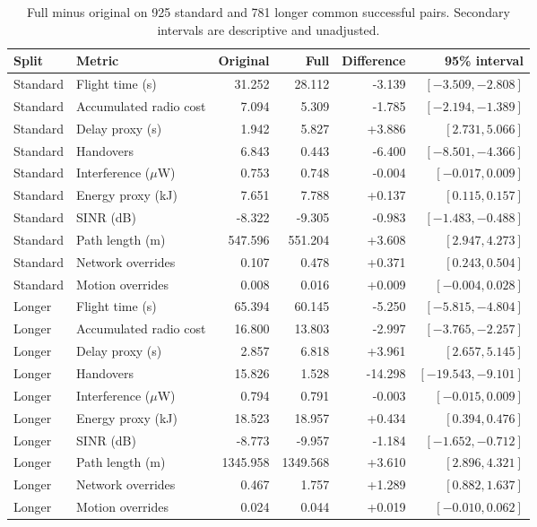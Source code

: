 \begin{table}[!t]
\caption{Full minus original on 925 standard and 781 longer common successful pairs. Secondary intervals are descriptive and unadjusted.}
\label{tab:paired}\centering\small
\begin{tabular}{llrrrr}\toprule
Split & Metric & Original & Full & Difference & 95\% interval\\\midrule
Standard & Flight time (s) & 31.252 & 28.112 & -3.139 & $[-3.509, -2.808]$\\
Standard & Accumulated radio cost & 7.094 & 5.309 & -1.785 & $[-2.194, -1.389]$\\
Standard & Delay proxy (s) & 1.942 & 5.827 & +3.886 & $[2.731, 5.066]$\\
Standard & Handovers & 6.843 & 0.443 & -6.400 & $[-8.501, -4.366]$\\
Standard & Interference ($\mu$W) & 0.753 & 0.748 & -0.004 & $[-0.017, 0.009]$\\
Standard & Energy proxy (kJ) & 7.651 & 7.788 & +0.137 & $[0.115, 0.157]$\\
Standard & SINR (dB) & -8.322 & -9.305 & -0.983 & $[-1.483, -0.488]$\\
Standard & Path length (m) & 547.596 & 551.204 & +3.608 & $[2.947, 4.273]$\\
Standard & Network overrides & 0.107 & 0.478 & +0.371 & $[0.243, 0.504]$\\
Standard & Motion overrides & 0.008 & 0.016 & +0.009 & $[-0.004, 0.028]$\\
Longer & Flight time (s) & 65.394 & 60.145 & -5.250 & $[-5.815, -4.804]$\\
Longer & Accumulated radio cost & 16.800 & 13.803 & -2.997 & $[-3.765, -2.257]$\\
Longer & Delay proxy (s) & 2.857 & 6.818 & +3.961 & $[2.657, 5.145]$\\
Longer & Handovers & 15.826 & 1.528 & -14.298 & $[-19.543, -9.101]$\\
Longer & Interference ($\mu$W) & 0.794 & 0.791 & -0.003 & $[-0.015, 0.009]$\\
Longer & Energy proxy (kJ) & 18.523 & 18.957 & +0.434 & $[0.394, 0.476]$\\
Longer & SINR (dB) & -8.773 & -9.957 & -1.184 & $[-1.652, -0.712]$\\
Longer & Path length (m) & 1345.958 & 1349.568 & +3.610 & $[2.896, 4.321]$\\
Longer & Network overrides & 0.467 & 1.757 & +1.289 & $[0.882, 1.637]$\\
Longer & Motion overrides & 0.024 & 0.044 & +0.019 & $[-0.010, 0.062]$\\
\bottomrule\end{tabular}
\end{table}
